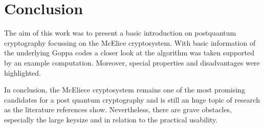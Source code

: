 \section{Conclusion}
\label{conclu}
The aim of this work was to present a basic introduction on postquantum cryptography focussing on the McElice cryptosystem. With basic information of the underlying Goppa codes a closer look at the algorithm was taken supported by an example computation. Moreover, special properties and disadvantages were highlighted. 

In conclusion, the McEliece cryptosystem remains one of the most promising candidates for a post quantum cryptography and is still an huge topic of research as the literature references show. Nevertheless, there are grave obstacles, especially the large keysize and in relation to the practical usability. 
